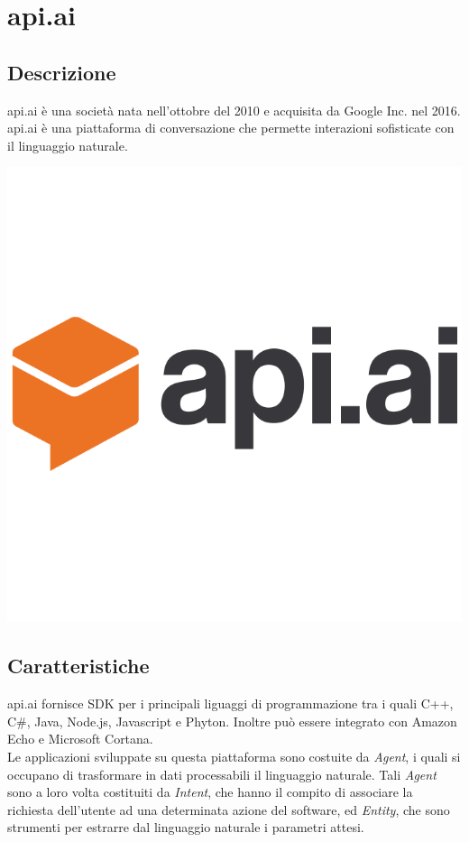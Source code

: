 \documentclass[a4paper,titlepage]{article}
\begin{document}
		
\newpage
\section{api.ai}
	\subsection{Descrizione}
	\begin{minipage}{0.7\textwidth}\raggedright
		api.ai è una società nata nell'ottobre del 2010 e acquisita da Google Inc. nel 2016.
		api.ai è una piattaforma di conversazione che permette interazioni sofisticate con il linguaggio naturale.
	\end{minipage}
	\hfill
	\noindent\begin{minipage}{0.1\textwidth}
		\includegraphics[scale=0.15]{images/apiai.png}
	\end{minipage}
	\subsection{Caratteristiche}
	api.ai fornisce SDK per i principali liguaggi di programmazione tra i quali C++, C\#, Java, Node.js, Javascript e Phyton. Inoltre può essere integrato con Amazon Echo e Microsoft Cortana.\\
	Le applicazioni sviluppate su questa piattaforma sono costuite da \textit{Agent}, i quali si occupano di trasformare in dati processabili il linguaggio naturale.
	Tali \textit{Agent} sono a loro volta costituiti da \textit{Intent}, che hanno il compito di associare la richiesta dell'utente ad una determinata azione del software, ed \textit{Entity}, che sono strumenti per estrarre dal linguaggio naturale i parametri attesi.\\
	
\end{document}
